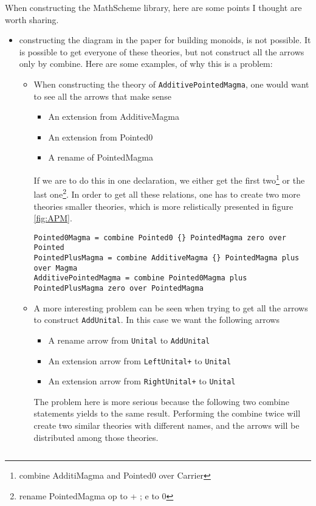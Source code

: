 \documentclass{article}
\begin{document}
When constructing the MathScheme library, here are some points I thought are worth sharing. 
\begin{itemize}
	\item constructing the diagram in the paper for building monoids, is not possible. It is possible to get everyone of these theories, but not construct all the arrows only by combine.
	Here are some examples, of why this is a problem: 
	\begin{itemize}
		\item When constructing the theory of \verb|AdditivePointedMagma|, one would want to see all the arrows that make sense
		\begin{itemize}
			\item An extension from AdditiveMagma 
			\item An extension from Pointed0 
			\item A rename of PointedMagma 
		\end{itemize}
	    If we are to do this in one declaration, we either get the first two\footnote{combine AdditiMagma {} and Pointed0 {} over Carrier} or the last one\footnote{rename PointedMagma {op to + ; e to 0}}. In order to get all these relations, one has to create two more theories smaller theories, which is more relistically presented in figure \ref{fig:APM}. 
	    \begin{Verbatim}[fontsize=\small]
Pointed0Magma = combine Pointed0 {} PointedMagma zero over Pointed
PointedPlusMagma = combine AdditiveMagma {} PointedMagma plus over Magma
AdditivePointedMagma = combine Pointed0Magma plus PointedPlusMagma zero over PointedMagma 	    
	    \end{Verbatim}
	\item A more interesting problem can be seen when trying to get all the arrows to construct \verb|AddUnital|. In this case we want the following arrows
	\begin{itemize}
		\item A rename arrow from \verb|Unital| to \verb|AddUnital|
		\item An extension arrow from \verb|LeftUnital+| to \verb|Unital| 
		\item An extension arrow from \verb|RightUnital+| to \verb|Unital| 
	\end{itemize}
	The problem here is more serious because the following two combine statements yields to the same result. Performing the combine twice will create two similar theories with different names, and the arrows will be distributed among those theories.  
	\begin{Verbatim}[fontsize=\small]

\end{Verbatim}
\end{itemize}
\end{itemize}
\end{document}
